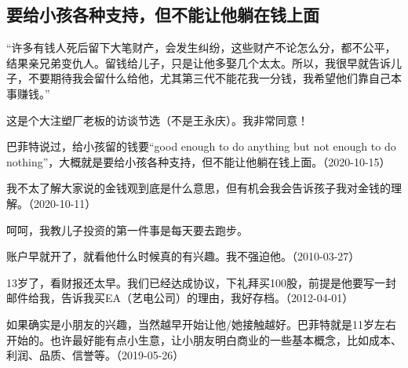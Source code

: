 \subsection{要给小孩各种支持，但不能让他躺在钱上面}


“许多有钱人死后留下大笔财产，会发生纠纷，这些财产不论怎么分，都不公平，结果亲兄弟变仇人。留钱给儿子，只是让他多娶几个太太。所以，我很早就告诉儿子，不要期待我会留什么给他，尤其第三代不能花我一分钱，我希望他们靠自己本事赚钱。”

这是个大注塑厂老板的访谈节选（不是王永庆）。我非常同意！



巴菲特说过，给小孩留的钱要“good enough to do anything but not enough to do nothing”，大概就是要给小孩各种支持，但不能让他躺在钱上面。（2020-10-15）


我不太了解大家说的金钱观到底是什么意思，但有机会我会告诉孩子我对金钱的理解。（2020-10-11）


呵呵，我教儿子投资的第一件事是每天要去跑步。

账户早就开了，就看他什么时候真的有兴趣。我不强迫他。（2010-03-27）


13岁了，看财报还太早。我们已经达成协议，下礼拜买100股，前提是他要写一封邮件给我，告诉我买EA（艺电公司）的理由，我好存档。（2012-04-01）


如果确实是小朋友的兴趣，当然越早开始让他/她接触越好。巴菲特就是11岁左右开始的。也许最好能有点小生意，让小朋友明白商业的一些基本概念，比如成本、利润、品质、信誉等。（2019-05-26）
